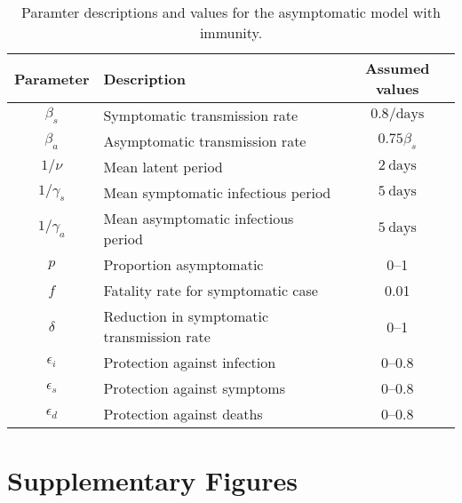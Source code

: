 \documentclass[12pt]{article}
\begin{document}
\begin{table}[h!]
  \begin{center}
    \begin{tabular}{c|l|c} %
      \textbf{Parameter} & \textbf{Description} & \textbf{Assumed values}\\
      \hline
      $\beta_s$ & Symptomatic transmission rate & $0.8/\mathrm{days}$\\
      \hline
      $\beta_a$ & Asymptomatic transmission rate & $0.75 \beta_s$ \\
      \hline
      $1/\nu$ & Mean latent period & $2\ \mathrm{days}$\\
      \hline
      $1/\gamma_s$ & Mean symptomatic infectious period & $5\ \mathrm{days}$\\
      \hline
      $1/\gamma_a$ & Mean asymptomatic infectious period & $5\ \mathrm{days}$\\
      \hline
      $p$ & Proportion asymptomatic & 0--1\\
      \hline
      $f$ & Fatality rate for symptomatic case & 0.01\\
      \hline
      $\delta$ & Reduction in symptomatic transmission rate & 0--1\\
      \hline
      $\epsilon_i$ & Protection against infection & 0--0.8\\
      \hline
      $\epsilon_s$ & Protection against symptoms & 0--0.8\\
      \hline
      $\epsilon_d$ & Protection against deaths & 0--0.8\\
    \end{tabular}
    \caption{Paramter descriptions and values for the asymptomatic model with immunity.}
    \label{tab:table1}
  \end{center}
\end{table}

\pagebreak

\section*{Supplementary Figures}
\end{document}
